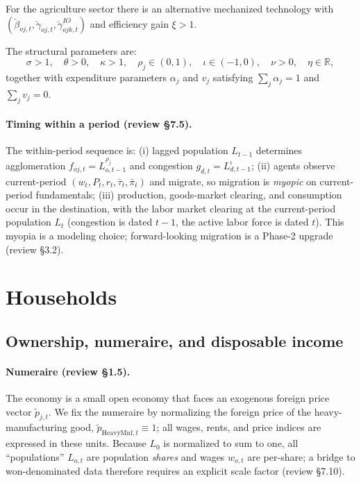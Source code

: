 \documentclass[11pt]{article}
\begin{document}
For the agriculture sector there is an alternative mechanized technology with
$(\breve\beta_{oj,t}, \breve\gamma_{oj,t}, \breve\gamma^{IO}_{ojk,t})$ and efficiency gain
$\xi > 1$.

The structural parameters are:
\[
\sigma > 1,\quad \theta > 0,\quad \kappa > 1,\quad \rho_j \in (0,1),\quad
\iota \in (-1,0),\quad \nu > 0,\quad \eta \in \mathbb{R},
\]
together with expenditure parameters $\alpha_j$ and $v_j$ satisfying
$\sum_j \alpha_j = 1$ and $\sum_j v_j = 0$.

\paragraph{Timing within a period (review \S7.5).} The within-period sequence is: (i)
lagged population $L_{t-1}$ determines agglomeration $f_{oj,t}=L_{o,t-1}^{\rho_j}$ and
congestion $g_{d,t}=L_{d,t-1}^{\iota}$; (ii) agents observe current-period
$(w_t,P_t,r_t,\bar\tau_t,\bar\pi_t)$ and migrate, so migration is \emph{myopic} on
current-period fundamentals; (iii) production, goods-market clearing, and consumption
occur in the destination, with the labor market clearing at the current-period population
$L_t$ (congestion is dated $t-1$, the active labor force is dated $t$). This myopia is a
modeling choice; forward-looking migration is a Phase-2 upgrade (review \S3.2).

\section{Households}
\subsection{Ownership, numeraire, and disposable income}
\paragraph{Numeraire (review \S1.5).} The economy is a small open economy that faces an
exogenous foreign price vector $\tilde p_{j,t}$. We fix the numeraire by normalizing the
foreign price of the heavy-manufacturing good, $\tilde p_{\mathrm{HeavyMnf},t}\equiv 1$;
all wages, rents, and price indices are expressed in these units. Because $L_{0}$ is
normalized to sum to one, all ``populations'' $L_{o,t}$ are population \emph{shares} and
wages $w_{o,t}$ are per-share; a bridge to won-denominated data therefore requires an
explicit scale factor (review \S7.10).
\end{document}
